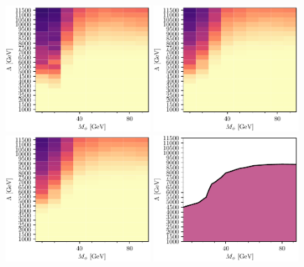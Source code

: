 \documentclass[11pt]{cernrep}
\begin{document}
\begin{figure}
\begin{center}
\includegraphics[width=0.49\textwidth]{cpo-wz-map.pdf}
\includegraphics[width=0.49\textwidth]{cpo-gg-map.pdf}
\includegraphics[width=0.49\textwidth]{cpo-map.pdf}
\includegraphics[width=0.49\textwidth]{cpo-contour.pdf}\\

\end{center}
\end{figure}
\end{document}
